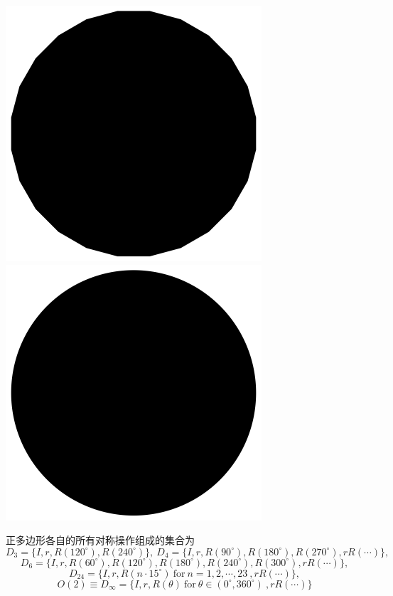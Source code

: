 \documentclass[CJK]{beamer}
\begin{document}
\begin{frame}
\begin{center}
\includegraphics[scale=0.15]{pol24}
\includegraphics[scale=0.15]{cir}
\end{center}
正多边形各自的所有对称操作组成的集合为
$$D_3 = \{I,r,R(120^\circ),R(240^\circ)\},\ D_4 = \{I,r,R(90^\circ),R(180^\circ),R(270^\circ),rR(\cdots)\},$$
$$D_6 = \{I,r,R(60^\circ),R(120^\circ),R(180^\circ),R(240^\circ),R(300^\circ),rR(\cdots)\},$$
$$D_{24} = \{I,r,R(n\cdot 15^\circ) \ \mathrm{for} \ n=1,2,\cdots,23\ ,rR(\cdots)\},$$
$$O(2) \equiv D_\infty = \{I,r,R(\theta) \ \mathrm{for} \ \theta \in (0^\circ, 360^\circ)\ ,rR(\cdots)\}$$


\ech
\end{frame}
\end{document}
